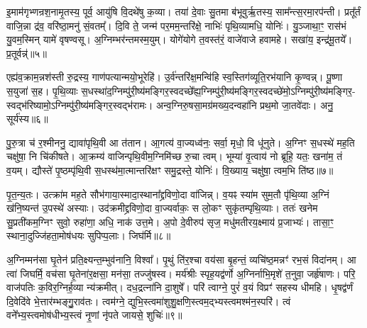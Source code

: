 {\anuvakamend[{इद्य॒ज्ञं प्र सु॑व॒ नारि॒रानु॑ष्टुभेन त्वा॒ छन्द॑सा॒ त्रीणि॑ च॥१॥}]}

इ॒माम॑गृभ्णन्रश॒नामृ॒तस्य॒ पूर्व॒ आयु॑षि वि॒दथे॑षु क॒व्या। तया॑ दे॒वाः सु॒तमा ब॑भूवुर्\mbox{}ऋ॒तस्य॒ साम᳚न्त्स॒रमा॒रप॑न्ती। प्रतू᳚र्तं वाजि॒न्ना द्र॑व॒ वरि॑ष्ठा॒मनु॑ सं॒वतम्᳚। दि॒वि ते॒ जन्म॑ पर॒मम॒न्तरि॑क्षे॒ नाभिः॑ पृथि॒व्यामधि॒ योनिः॑। यु॒ञ्जाथा॒ꣳ॒ रास॑भं यु॒वम॒स्मिन् यामे॑ वृषण्वसू। अ॒ग्निम्भर॑न्तमस्म॒युम्। योगे॑योगे त॒वस्त॑रं॒ वाजे॑वाजे हवामहे। सखा॑य॒ इन्द्र॑मू॒तये᳚। प्र॒तूर्वन्न्॑॥५॥

एह्य॑व॒क्राम॒न्नश॑स्ती रु॒द्रस्य॒ गाण॑पत्यान्मयो॒भूरेहि॑। उ॒र्व॑न्तरि॑क्ष॒मन्वि॑हि स्व॒स्तिग॑व्यूति॒रभ॑यानि कृ॒ण्वन्न्। पू॒ष्णा स॒युजा॑ स॒ह। पृ॒थि॒व्याः स॒धस्था॑द॒ग्निम्पु॑री॒ष्य॑मङ्गिर॒स्वदच्छे᳚ह्य॒ग्निम्पु॑री॒ष्य॑मङ्गिर॒स्वदच्छे॑मो॒\-ऽग्निम्पु॑री॒ष्य॑मङ्गिर॒- स्वद्भ॑रिष्यामो॒\-ऽग्निम्पु॑री॒ष्य॑मङ्गिर॒स्वद्भ॑रामः। अन्व॒ग्निरु॒षसा॒मग्र॑मख्य॒दन्वहा॑नि प्रथ॒मो जा॒तवे॑दाः। अनु॒ सूर्य॑स्य॥६॥

पु॒रु॒त्रा च॑ र॒श्मीननु॒ द्यावा॑पृथि॒वी आ त॑तान। आ॒गत्य॑ वा॒ज्यध्व॑नः॒ सर्वा॒ मृधो॒ वि धू॑नुते। अ॒ग्निꣳ स॒धस्थे॑ मह॒ति चक्षु॑षा॒ नि चि॑कीषते। आ॒क्रम्य॑ वाजिन्पृथि॒वीम॒ग्निमि॑च्छ रु॒चा त्वम्। भूम्या॑ वृ॒त्वाय॑ नो ब्रूहि॒ यतः॒ खना॑म॒ तं व॒यम्। द्यौस्ते॑ पृ॒ष्ठम्पृ॑थि॒वी स॒धस्थ॑मा॒त्मान्तरि॑क्षꣳ समु॒द्रस्ते॒ योनिः॑। वि॒ख्याय॒ चक्षु॑षा॒ त्वम॒भि ति॑ष्ठ॥७॥

पृ॒त॒न्य॒तः। उत्क्रा॑म मह॒ते सौभ॑गाया॒स्मादा॒स्थाना᳚द्द्रविणो॒दा वा॑जिन्न्। व॒यꣴ स्या॑म सुम॒तौ पृ॑थि॒व्या अ॒ग्निं ख॑नि॒ष्यन्त॑ उ॒पस्थे॑ अस्याः। उद॑क्रमीद्द्रविणो॒दा वा॒ज्यर्वाकः॒ स लो॒कꣳ सुकृ॑तम्पृथि॒व्याः। ततः॑ खनेम सु॒प्रती॑कम॒ग्निꣳ सुवो॒ रुहा॑णा॒ अधि॒ नाक॑ उत्त॒मे। अ॒पो दे॒वीरुप॑ सृज॒ मधु॑मतीरय॒क्ष्माय॑ प्र॒जाभ्यः॑। तासा॒ꣳ॒ स्थाना॒दुज्जि॑हता॒मोष॑धयः सुपिप्प॒लाः। जिघ॑र्मि॥८॥

अ॒ग्निम्मन॑सा घृ॒तेन॑ प्रति॒क्ष्यन्त॒म्भुव॑नानि॒ विश्वा᳚। पृ॒थुं ति॑र॒श्चा वय॑सा बृ॒हन्तं॒ व्यचि॑ष्ठ॒मन्नꣳ॑ रभ॒सं विदा॑नम्। आ त्वा॑ जिघर्मि॒ वच॑सा घृ॒तेना॑र॒क्षसा॒ मन॑सा॒ तज्जु॑षस्व। मर्य॑श्रीः स्पृह॒यद्व॑र्णो अ॒ग्निर्नाभि॒मृशे॑ त॒नुवा॒ जर्\mbox{}हृ॑षाणः। परि॒ वाज॑पतिः क॒विर॒ग्निर्\mbox{}ह॒व्या न्य॑क्रमीत्। दध॒द्रत्ना॑नि दा॒शुषे᳚। परि॑ त्वाग्ने॒ पुरं॑ व॒यं विप्रꣳ॑ सहस्य धीमहि। धृ॒षद्व॑र्णं दि॒वेदि॑वे भे॒त्तार॑म्भङ्गु॒॒राव॑तः। त्वम॑ग्ने॒ द्युभि॒स्त्वमा॑शुशु॒क्षणि॒स्त्वम॒द्भ्यस्त्वमश्म॑न॒स्परि॑। त्वं वने᳚भ्य॒स्त्वमोष॑धीभ्य॒स्त्वं नृ॒णां नृ॑पते जायसे॒ शुचिः॑॥९॥

{\anuvakamend[{प्र॒तूर्व॒न्थ्सूर्य॑स्य तिष्ठ॒ जिघ॑र्मि भे॒त्तारं॑ विꣳश॒तिश्च॑॥२॥}]}

